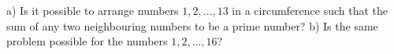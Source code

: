a) Is it possible to arrange numbers $1,2,...,13$ in a circumference such that the sum of any two neighbouring numbers to be a prime number?
b) Is the same problem possible for the numbers $1,2,...,16$?